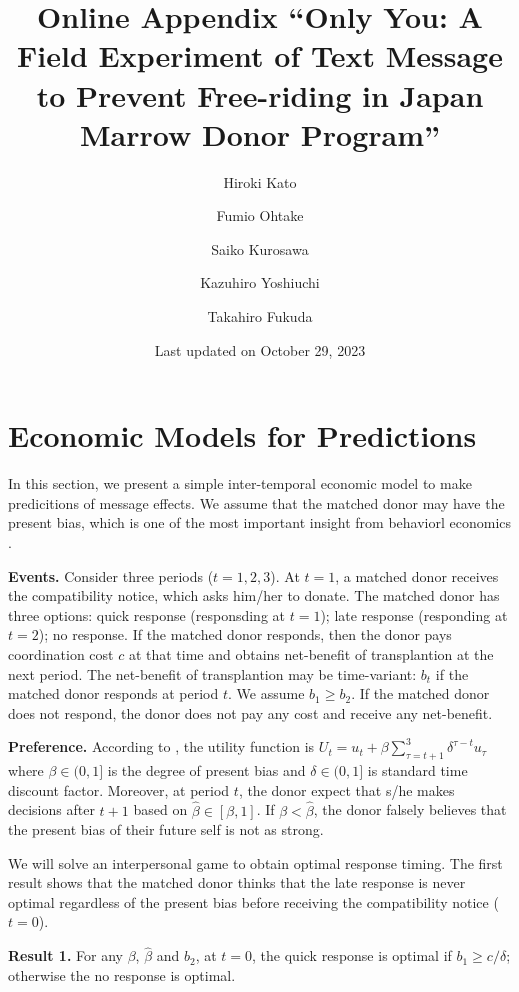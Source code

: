 \documentclass[
]{article}
\title{Online Appendix
``Only You: A Field Experiment of Text Message to Prevent Free-riding in Japan Marrow Donor Program''}
\author{Hiroki Kato \and Fumio Ohtake \and Saiko Kurosawa \and Kazuhiro Yoshiuchi \and Takahiro Fukuda}
\date{Last updated on October 29, 2023}
\begin{document}
\maketitle

{
\setcounter{tocdepth}{2}
\tableofcontents
}
\hypertarget{economic-models-for-predictions}{%
\section{Economic Models for Predictions}\label{economic-models-for-predictions}}

In this section, we present a simple inter-temporal economic model to make predicitions of message effects. We assume that the matched donor may have the present bias, which is one of the most important insight from behaviorl economics \citep{Laibson1997, ODonoghue2001}.

\noindent
\textbf{Events.} Consider three periods (\(t = 1, 2, 3\)). At \(t=1\), a matched donor receives the compatibility notice, which asks him/her to donate. The matched donor has three options: quick response (responsding at \(t=1\)); late response (responding at \(t=2\)); no response. If the matched donor responds, then the donor pays coordination cost \(c\) at that time and obtains net-benefit of transplantion at the next period. The net-benefit of transplantion may be time-variant: \(b_t\) if the matched donor responds at period \(t\). We assume \(b_1 \ge b_2\). If the matched donor does not respond, the donor does not pay any cost and receive any net-benefit.

\noindent
\textbf{Preference.} According to \citet{Laibson1997}, the utility function is \(U_t = u_t + \beta \sum_{\tau = t + 1}^{3} \delta^{\tau - t} u_{\tau}\) where \(\beta \in (0, 1]\) is the degree of present bias and \(\delta \in (0, 1]\) is standard time discount factor. Moreover, at period \(t\), the donor expect that s/he makes decisions after \(t + 1\) based on \(\hat{\beta} \in [\beta, 1]\). If \(\beta < \hat{\beta}\), the donor falsely believes that the present bias of their future self is not as strong.

We will solve an interpersonal game \citep{ODonoghue2001} to obtain optimal response timing. The first result shows that the matched donor thinks that the late response is never optimal regardless of the present bias before receiving the compatibility notice (\(t=0\)).

\noindent
\textbf{Result 1.} For any \(\beta\), \(\hat{\beta}\) and \(b_2\), at \(t = 0\), the quick response is optimal if \(b_1 \ge c/\delta\); otherwise the no response is optimal.
\end{document}
